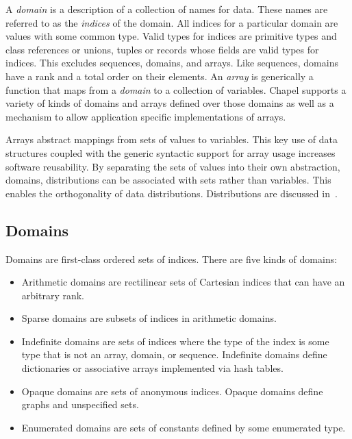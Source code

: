 \label{Domains_and_Arrays}

A {\em domain} is a description of a collection of names for data.
These names are referred to as the {\em indices} of the domain.  All
indices for a particular domain are values with some common type.
Valid types for indices are primitive types and class references or
unions, tuples or records whose fields are valid types for indices.
This excludes sequences, domains, and arrays.  Like sequences, domains
have a rank and a total order on their elements.  An {\em array} is
generically a function that maps from a {\em domain} to a collection
of variables.  Chapel supports a variety of kinds of domains and
arrays defined over those domains as well as a mechanism to allow
application specific implementations of arrays.

Arrays abstract mappings from sets of values to variables.  This key
use of data structures coupled with the generic syntactic support for
array usage increases software reusability.  By separating the sets of
values into their own abstraction, domains, distributions can be
associated with sets rather than variables.  This enables the
orthogonality of data distributions.  Distributions are discussed
in~.

\subsection{Domains}
\label{Domains}

Domains are first-class ordered sets of indices.  There are five kinds
of domains:
\begin{itemize}
\item
Arithmetic domains are rectilinear sets of Cartesian indices that can
have an arbitrary rank.
\item
Sparse domains are subsets of indices in arithmetic domains.
\item
Indefinite domains are sets of indices where the type of the index is
some type that is not an array, domain, or sequence.  Indefinite
domains define dictionaries or associative arrays implemented via hash
tables.
\item
Opaque domains are sets of anonymous indices.  Opaque domains define
graphs and unspecified sets.
\item
Enumerated domains are sets of constants defined by some enumerated
type.
\end{itemize}

